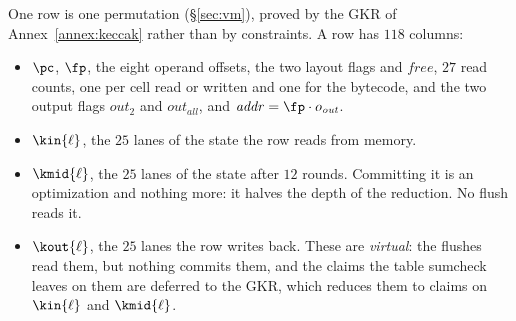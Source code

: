 One row is one permutation (\S\ref{sec:vm}), proved by the GKR of Annex~\ref{annex:keccak} rather than by constraints. A row has $118$ columns:
\begin{itemize}
\item $\pc$, $\fp$, the eight operand offsets, the two layout flags and $\mathit{free}$, $27$ read counts, one per cell read or written and one for the bytecode, and the two output flags $\mathit{out}_2$ and $\mathit{out}_{\mathit{all}}$, and $\mathit{addr}=\fp\cdot o_{\mathit{out}}$.
\item $\kin{\ell}$, the $25$ lanes of the state the row reads from memory.
\item $\kmid{\ell}$, the $25$ lanes of the state after $12$ rounds. Committing it is an optimization and nothing more: it halves the depth of the reduction. No flush reads it.
\item $\kout{\ell}$, the $25$ lanes the row writes back. These are \emph{virtual}: the flushes read them, but nothing commits them, and the claims the table sumcheck leaves on them are deferred to the GKR, which reduces them to claims on $\kin{\ell}$ and $\kmid{\ell}$.
\end{itemize}

